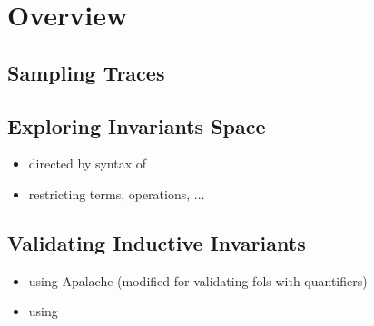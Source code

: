 
\section{Overview}  \label{section:overview}

\subsection{Sampling \tlaplus{} Traces} \label{ss:samping}

\subsection{Exploring Invariants Space} \label{ss:exploring}

\begin{itemize}
  \item directed by syntax of \tlaplus
  \item restricting terms, operations, $\ldots$
\end{itemize}
\subsection{Validating Inductive Invariants} \label{ss:validating}

\begin{itemize}
  \item using Apalache (modified for validating fols with quantifiers)
  \item using \cite{ProofAutomation:PhDThesis2014}
\end{itemize}
